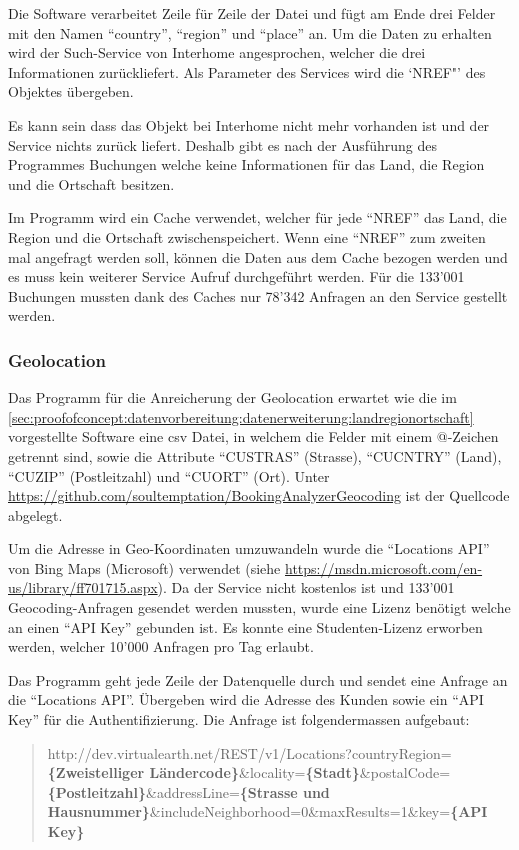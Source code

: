 Die Software verarbeitet Zeile für Zeile der Datei und fügt am Ende drei Felder mit den Namen "`country"', "`region"' und "`place"' an. Um die Daten zu erhalten wird der Such-Service von Interhome angesprochen, welcher die drei Informationen zurückliefert. Als Parameter des Services wird die `NREF"' des Objektes übergeben. 

Es kann sein dass das Objekt bei Interhome nicht mehr vorhanden ist und der Service nichts zurück liefert. Deshalb gibt es nach der Ausführung des Programmes Buchungen welche keine Informationen für das Land, die Region und die Ortschaft besitzen.

Im Programm wird ein Cache verwendet, welcher für jede "`NREF"' das Land, die Region und die Ortschaft zwischenspeichert. Wenn eine "`NREF"' zum zweiten mal angefragt werden soll, können die Daten aus dem Cache bezogen werden und es muss kein weiterer Service Aufruf durchgeführt werden. Für die 133'001 Buchungen mussten dank des Caches nur 78'342 Anfragen an den Service gestellt werden.

\subsubsection{Geolocation}
\label{sec:proofofconcept:datenvorbereitung:datenerweiterung:geolocation}
Das Programm für die Anreicherung der Geolocation erwartet wie die im \cref{sec:proofofconcept:datenvorbereitung:datenerweiterung:landregionortschaft} vorgestellte Software eine \gls{csv} Datei, in welchem die Felder mit einem @-Zeichen getrennt sind, sowie die Attribute "`CUSTRAS"' (Strasse), "`CUCNTRY"' (Land), "`CUZIP"' (Postleitzahl) und "`CUORT"' (Ort). Unter \url{https://github.com/soultemptation/BookingAnalyzerGeocoding} ist der Quellcode abgelegt. 

Um die Adresse in Geo-Koordinaten umzuwandeln wurde die "`Locations API"' von Bing Maps (Microsoft) verwendet (siehe \url{https://msdn.microsoft.com/en-us/library/ff701715.aspx}). Da der Service nicht kostenlos ist und 133'001 Geocoding-Anfragen gesendet werden mussten, wurde eine Lizenz benötigt welche an einen "`API Key"' gebunden ist. Es konnte eine Studenten-Lizenz erworben werden, welcher 10'000 Anfragen pro Tag erlaubt.

Das Programm geht jede Zeile der Datenquelle durch und sendet eine Anfrage an die "`Locations API"'. Übergeben wird die Adresse des Kunden sowie ein "`API Key"' für die Authentifizierung. Die Anfrage ist folgendermassen aufgebaut:

\blockquote[]{http://dev.virtualearth.net/REST/v1/Locations?countryRegion=\textbf{\{Zweistelliger Ländercode\}}\&locality=\textbf{\{Stadt\}}\&postalCode=\textbf{\{Postleitzahl\}}\&addressLine=\textbf{\{Strasse und Hausnummer\}}\&includeNeighborhood=0\&maxResults=1\&key=\textbf{\{API Key\}}}


